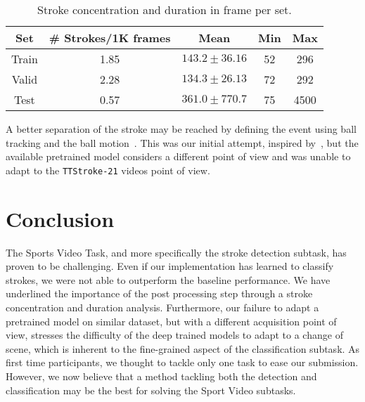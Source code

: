 \documentclass[sigconf]{acmart-me}
\begin{document}
\begin{table}
    \caption{Stroke concentration and duration in frame per set.}
    \begin{tabular}{|c|cccc|}
    \hline
    Set  & \# Strokes/1K frames & Mean  & Min  & Max \\
    \hline
    Train & 1.85    & $143.2\pm36.16$   & 52 & 296   \\
    Valid & 2.28    & $134.3\pm26.13$   & 72 & 292   \\
    Test  & 0.57    & $361.0\pm770.7$   & 75 & 4500  \\ 
    \hline
    \end{tabular}
    \label{tab:hist}
\end{table}



\par 

A better separation of the stroke may be reached by defining the event using ball tracking and the ball motion~\cite{calandre2021table}. This was our initial attempt, inspired by~\cite{voeikov2020ttnet}, but the available pretrained model considers a different point of view and was unable to adapt to the \texttt{TTStroke-21} videos point of view.




\section{Conclusion}
\label{sec:conclusion}

The Sports Video Task, and more specifically the stroke detection subtask, has proven to be challenging. Even if our implementation has learned to classify strokes, we were not able to outperform the baseline performance. We have underlined the importance of the post processing step through a stroke concentration and duration analysis. Furthermore, our failure to adapt a pretrained model on similar dataset, but with a different acquisition point of view, stresses the difficulty of the deep trained models to adapt to a change of scene, which is inherent to the fine-grained aspect of the classification subtask. As first time participants, we thought to tackle only one task to ease our submission. However, we now believe that a method tackling both the detection and classification may be the best for solving the Sport Video subtasks.



\def\bibfont{\small}  
\end{document}
